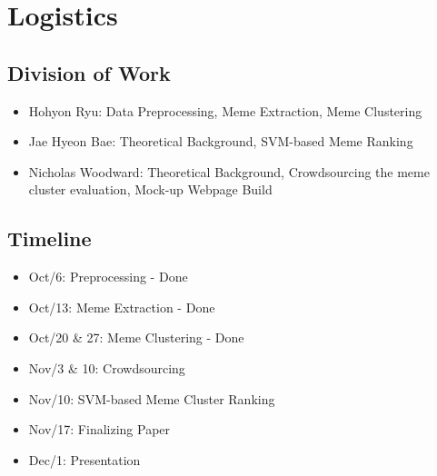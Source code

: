 \documentclass{sig-alternate}
\begin{document}
\section{Logistics}

\subsection{Division of Work}

\begin{itemize}
\item Hohyon Ryu: Data Preprocessing, Meme Extraction, Meme Clustering
\item Jae Hyeon Bae: Theoretical Background, SVM-based Meme Ranking
\item Nicholas Woodward: Theoretical Background, Crowdsourcing the meme cluster evaluation, Mock-up Webpage Build
\end{itemize}

\subsection{Timeline}


\begin{itemize}
  \item Oct/6: Preprocessing - Done
  \item Oct/13: Meme Extraction - Done
  \item Oct/20 \& 27: Meme Clustering - Done
  \item Nov/3 \& 10: Crowdsourcing 
  \item Nov/10: SVM-based Meme Cluster Ranking
  \item Nov/17: Finalizing Paper
  \item Dec/1: Presentation
\end{itemize}


%

\end{document}
